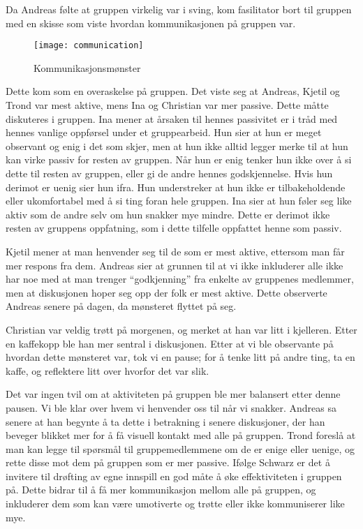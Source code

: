 Da Andreas følte at gruppen virkelig var i sving, kom fasilitator bort
til gruppen med en skisse som viste hvordan kommunikasjonen på gruppen
var.
\begin{figure}
\begin{center}
\texttt{[image: communication]}
\caption{Kommunikasjonsmønster}
\end{center}
\end{figure}
Dette kom som en overaskelse på gruppen. Det viste seg at Andreas,
Kjetil og Trond var mest aktive, mens Ina og Christian var mer passive.
Dette måtte diskuteres i gruppen.  Ina mener at årsaken til hennes
passivitet er i tråd med hennes vanlige oppførsel under et gruppearbeid.
Hun sier at hun er meget observant og enig i det som skjer, men at hun
ikke alltid legger merke til at hun kan virke passiv for resten av
gruppen. Når hun er enig tenker hun ikke over å si dette til resten av
gruppen, eller gi de andre hennes godskjennelse. Hvis hun derimot er
uenig sier hun ifra. Hun understreker at hun ikke er tilbakeholdende
eller ukomfortabel med å si ting foran hele gruppen. Ina sier at hun
føler seg like aktiv som de andre selv om hun snakker mye mindre. Dette
er derimot ikke resten av gruppens oppfatning, som i dette tilfelle
oppfattet henne som passiv. 

Kjetil mener at man henvender seg til de som er mest aktive, ettersom
man får mer respons fra dem. Andreas sier at grunnen til at vi ikke
inkluderer alle ikke har noe med at man trenger “godkjenning” fra
enkelte av gruppenes medlemmer, men at diskusjonen hoper seg opp der
folk er mest aktive. Dette observerte Andreas senere på dagen, da
mønsteret flyttet på seg. 

Christian var veldig trøtt på morgenen, og merket at han var litt i
kjelleren. Etter en kaffekopp ble han mer sentral i diskusjonen. Etter
at vi ble observante på hvordan dette mønsteret var, tok vi en pause;
for å tenke litt på andre ting, ta en kaffe, og reflektere litt over
hvorfor det var slik. 

Det var ingen tvil om at aktiviteten på gruppen ble mer balansert etter
denne pausen. Vi ble klar over hvem vi henvender oss til når vi snakker.
Andreas sa senere at han begynte å ta dette i betrakning i senere
diskusjoner, der han beveger blikket mer for å få visuell kontakt med
alle på gruppen. Trond foreslå at man kan legge til spørsmål til
gruppemedlemmene om de er enige eller uenige, og rette disse mot dem på
gruppen som er mer passive. Ifølge Schwarz \cite{Schwarz} er det å invitere til drøfting av egne innspill en god måte å øke effektiviteten i gruppen på. Dette bidrar til å få mer kommunikasjon
mellom alle på gruppen, og inkluderer dem som kan være umotiverte og
trøtte eller ikke kommuniserer like mye. 

